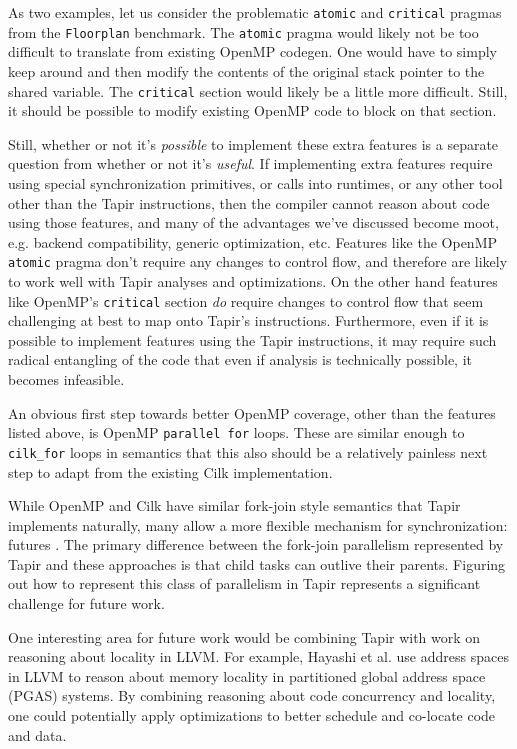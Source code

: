 \documentclass[sigconf]{acmart}
\begin{document}
As two examples, let us consider the problematic \texttt{atomic} and
\texttt{critical} pragmas from the \texttt{Floorplan} benchmark. The 
\texttt{atomic} pragma would likely not be too difficult to translate
from existing OpenMP codegen. One would have to simply keep around and then
modify the contents of the original stack pointer to the shared variable. The
\texttt{critical} section would likely be a little more difficult. Still, it
should be possible to modify existing OpenMP code to block on that section. 

Still, whether or not it's \emph{possible} to implement these extra features
is a separate question from whether or not it's \emph{useful}. If implementing
extra features require using special synchronization primitives, or calls into
runtimes, or any other tool other than the Tapir instructions, then the
compiler cannot reason about code using those features, and many of the
advantages we've discussed become moot, e.g. backend compatibility, generic 
optimization, etc. Features like the OpenMP \texttt{atomic} pragma don't 
require any changes to control flow, and therefore are likely to work well 
with Tapir analyses and optimizations. On the other hand features like OpenMP's
\texttt{critical} section \emph{do} require changes to control flow that seem
challenging at best to map onto Tapir's instructions. Furthermore, even if it
is possible to implement features using the Tapir instructions, it may require 
such radical entangling of the code that even if analysis is technically
possible, it becomes infeasible. 

An obvious first step towards better OpenMP coverage, other than the features
listed above, is OpenMP \texttt{parallel for} loops. These are similar enough
to \texttt{cilk\_for} loops in semantics that this also should be a relatively
painless next step to adapt from the existing Cilk implementation. 

While OpenMP and Cilk have similar fork-join style semantics that Tapir
implements naturally, many allow a more flexible mechanism for synchronization:
futures \cite{qthreads, chapel, hpx}. The primary difference between the
fork-join parallelism represented by Tapir and these approaches is that
child tasks can outlive their parents. Figuring out how to represent this class
of parallelism in Tapir represents a significant challenge for future work.

One interesting area for future work would be combining Tapir with work on
reasoning about locality in LLVM. For example, Hayashi et al.
\cite{hayashi2015llvm} use address spaces in LLVM to reason about memory
locality in partitioned global address space (PGAS) systems. By combining
reasoning about code concurrency and locality, one could potentially apply
optimizations to better schedule and co-locate code and data.
\end{document}
